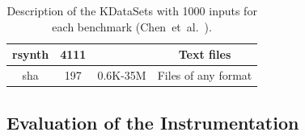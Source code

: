 \documentclass[sigplan,9pt]{acmart}
\newcommand{\etal}{et~al.}
\begin{document}
\begin{table}[h]
{\begin{tabular}{|c|c|c|c|}
rsynth        & 4111   &                            &  Text files                    \\ \hline %
sha           & 197    & 0.6K-35M                   & Files of any format            \\ \hline
\end{tabular}
}
\caption{Description of the KDataSets with 1000 inputs for each benchmark (Chen~\etal~\cite{chen10,chen12a}).}
\label{tab:kdatasets}
\end{table}

\subsection{Evaluation of the Instrumentation}
\end{document}

